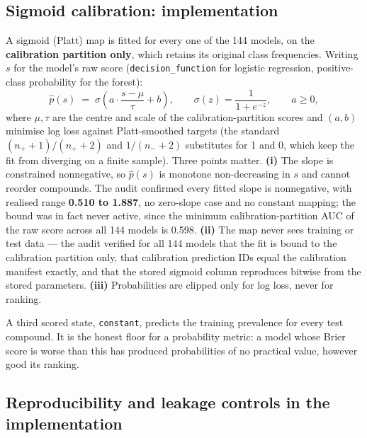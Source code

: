 \documentclass[10pt,letterpaper]{article}
\begin{document}
\subsection{Sigmoid calibration: implementation}
\label{sec:calibimpl}

A sigmoid (Platt) map is fitted for every one of the 144 models, on the \textbf{calibration partition
only}, which retains its original class frequencies. Writing $s$ for the model's raw score
(\texttt{decision\_function} for logistic regression, positive-class probability for the forest):
\[
\hat{p}(s) \;=\; \sigma\!\left(a \cdot \frac{s - \mu}{\tau} + b\right),
\qquad \sigma(z) = \frac{1}{1+e^{-z}},
\qquad \boxed{a \ge 0},
\]
where $\mu,\tau$ are the centre and scale of the calibration-partition scores and $(a,b)$ minimise
log loss against Platt-smoothed targets (the standard $(n_++1)/(n_++2)$ and $1/(n_-+2)$ substitutes
for 1 and 0, which keep the fit from diverging on a finite sample). Three points matter.
\textbf{(i)} The slope is constrained nonnegative, so $\hat p(s)$ is monotone non-decreasing in $s$
and cannot reorder compounds. The audit confirmed every fitted slope is nonnegative, with realised
range \textbf{0.510 to 1.887}, no zero-slope case and no constant mapping; the bound was in fact
never active, since the minimum calibration-partition AUC of the raw score across all 144 models is
0.598. \textbf{(ii)} The map never sees training or test data --- the audit verified for all 144
models that the fit is bound to the calibration partition only, that calibration prediction IDs equal
the calibration manifest exactly, and that the stored sigmoid column reproduces bitwise from the
stored parameters. \textbf{(iii)} Probabilities are clipped only for log loss, never for ranking.

A third scored state, \texttt{constant}, predicts the training prevalence for every test compound. It
is the honest floor for a probability metric: a model whose Brier score is worse than this has
produced probabilities of no practical value, however good its ranking.

\subsection{Reproducibility and leakage controls in the implementation}
\end{document}
